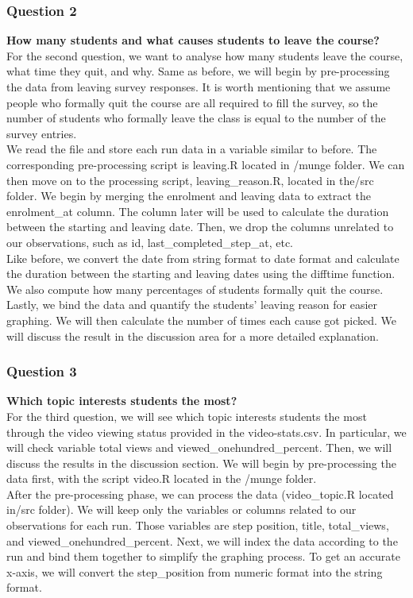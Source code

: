\documentclass[12pt,]{article}
\begin{document}
\hypertarget{question-2}{%
\subsubsection{Question 2}\label{question-2}}

\textbf{How many students and what causes students to leave the
course?}\\
\hfill\break For the second question, we want to analyse how many
students leave the course, what time they quit, and why. Same as before,
we will begin by pre-processing the data from leaving survey responses.
It is worth mentioning that we assume people who formally quit the
course are all required to fill the survey, so the number of students
who formally leave the class is equal to the number of the survey
entries.\\
\hfill\break We read the file and store each run data in a variable
similar to before. The corresponding pre-processing script is leaving.R
located in /munge folder. We can then move on to the processing script,
leaving\_reason.R, located in the/src folder. We begin by merging the
enrolment and leaving data to extract the enrolment\_at column. The
column later will be used to calculate the duration between the starting
and leaving date. Then, we drop the columns unrelated to our
observations, such as id, last\_completed\_step\_at, etc.\\
\hfill\break Like before, we convert the date from string format to date
format and calculate the duration between the starting and leaving dates
using the difftime function. We also compute how many percentages of
students formally quit the course. Lastly, we bind the data and quantify
the students' leaving reason for easier graphing. We will then calculate
the number of times each cause got picked. We will discuss the result in
the discussion area for a more detailed explanation.

\hypertarget{question-3}{%
\subsubsection{Question 3}\label{question-3}}

\textbf{Which topic interests students the most?}\\
\hfill\break For the third question, we will see which topic interests
students the most through the video viewing status provided in the
video-stats.csv. In particular, we will check variable total views and
viewed\_onehundred\_percent. Then, we will discuss the results in the
discussion section. We will begin by pre-processing the data first, with
the script video.R located in the /munge folder.\\
\hfill\break After the pre-processing phase, we can process the data
(video\_topic.R located in/src folder). We will keep only the variables
or columns related to our observations for each run. Those variables are
step position, title, total\_views, and viewed\_onehundred\_percent.
Next, we will index the data according to the run and bind them together
to simplify the graphing process. To get an accurate x-axis, we will
convert the step\_position from numeric format into the string format.
\end{document}
